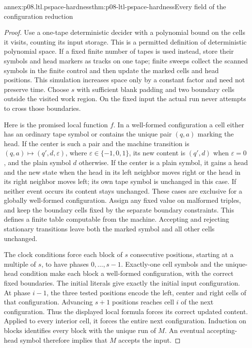 \begin{annexitem}{annex:p08.ltl.pspace-hardness}{thm:p08-ltl-pspace-hardness}{Every field of the configuration reduction}
\begin{proof}
Use a one-tape deterministic decider with a polynomial bound on
the cells it visits, counting its input storage. This is a
permitted definition of deterministic polynomial space. If a
fixed finite number of tapes is used instead, store their symbols
and head markers as tracks on one tape; finite sweeps collect
the scanned symbols in the finite control and then update the
marked cells and head positions. This simulation increases
space only by a constant factor and need not preserve time.
Choose \(s\) with sufficient blank padding and two boundary
cells outside the visited work region. On the fixed input the
actual run never attempts to cross those boundaries.

Here is the promised local function \(f\). In a well-formed
configuration a cell either has an ordinary tape symbol or
contains the unique pair \((q,a)\) marking the head. If the
center is such a pair and the machine transition is
\((q,a)\mapsto(q',d,\varepsilon)\), where
\(\varepsilon\in\{-1,0,1\}\), its new content is \((q',d)\)
when \(\varepsilon=0\), and the plain symbol \(d\) otherwise.
If the center is a plain symbol, it gains a head and the new
state when the head in its left neighbor moves right or the
head in its right neighbor moves left; its own tape symbol is
unchanged in this case. If neither event occurs its content
stays unchanged. These cases are exclusive for a globally
well-formed configuration. Assign any fixed value on malformed
triples, and keep the boundary cells fixed by the separate
boundary constraints. This defines a finite table computable
from the machine. Accepting and rejecting stationary transitions
leave both the marked symbol and all other cells unchanged.

The clock conditions force each block of \(s\) consecutive
positions, starting at a multiple of \(s\), to have phases
\(0,\ldots,s-1\). Exactly-one cell symbols and the unique-head
condition make each block a well-formed configuration, with
the correct fixed boundaries. The initial literals give exactly
the initial input configuration. At phase \(i-1\), the three
tested positions encode the left, center and right cells of
that configuration. Advancing \(s+1\) positions reaches cell
\(i\) of the next configuration. Thus the displayed local
formula forces its correct updated content. Applied to every
interior cell, it forces the entire next configuration.
Induction on blocks identifies every block with the unique
run of \(M\). An eventual accepting-head symbol therefore
implies that \(M\) accepts the input.


\end{proof}
\end{annexitem}
